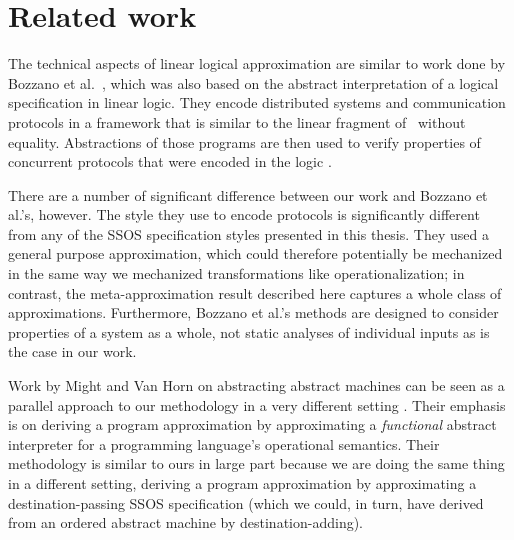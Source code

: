 \section{Related work}
\label{sec:approximately-related}

The technical aspects of linear logical approximation are similar to
work done by Bozzano et al.~\cite{bozzano02effective,bozzano04model},
which was also based on the abstract interpretation of a logical
specification in linear logic.
They encode distributed systems and communication protocols in
a framework that is similar to the linear fragment of \sls~without
equality. Abstractions of those programs are then used to verify
properties of concurrent protocols that were encoded in the logic
\cite{bozzano02protocol}. 

There are a number of significant difference between our work and
Bozzano et al.'s, however. The style they use to encode protocols is
significantly different from any of the SSOS specification styles
presented in this thesis. They used a general purpose approximation,
which could therefore potentially be mechanized in the same way we
mechanized transformations like operationalization; in contrast, the
meta-approximation result described here captures a whole class of
approximations. Furthermore, Bozzano et al.'s methods are designed to
consider properties of a system as a whole, not static analyses of
individual inputs as is the case in our work.

Work by Might and Van Horn on abstracting abstract machines can be
seen as a parallel approach to our methodology in a very different
setting
\cite{might10resolving,might10abstract,might10abstracting}. Their
emphasis is on deriving a program approximation by approximating a
{\it functional} abstract interpreter for a programming language's
operational semantics. Their methodology is similar to ours in large
part because we are doing the same thing in a different setting,
deriving a program approximation by approximating a
destination-passing SSOS specification (which we could, in turn, have
derived from an ordered abstract machine by destination-adding).

